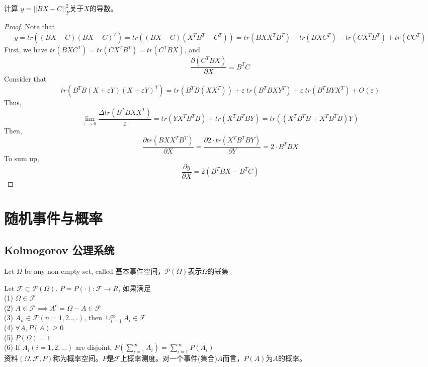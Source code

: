 \documentclass[11pt,fleqn]{book} %
\begin{document}
\begin{CJK}{UTF8}{gkai}
\begin{example}
    计算 $y = ||BX - C||_F^2$关于$X$的导数。
\end{example}
\begin{proof}
    Note that 
    \[
        y = tr\left((BX - C)(BX-C)^T\right) = tr\left((BX-C)(X^TB^T-C^T)\right) = tr\left(BXX^TB^T\right) - tr\left(BXC^T\right) - tr\left(CX^TB^T\right) + tr\left(CC^T\right)\]   
    First, we have $tr\left(BXC^T\right) = tr\left(CX^TB^T\right) = tr\left(C^TBX\right)$, and 
    \[
        \frac{\partial (C^TBX)}{\partial X} = B^TC\]
    Consider that 
    \[
        tr\left(B^TB(X + \varepsilon Y)(X + \varepsilon Y)^T\right) = tr\left(B^TB(XX^T)\right) + \varepsilon \ tr\left(B^TBXY^T\right) + \varepsilon \ tr\left(B^TBYX^T\right) + O(\varepsilon)
        \]
    Thus, 
    \[
        \lim_{\varepsilon \to 0} \frac {\Delta tr(B^TBXX^T)}{\varepsilon} = tr(YX^TB^TB) + tr(X^TB^TBY) = tr\left((X^TB^TB+X^TB^TB)Y\right)\]
    Then,
    \[
        \frac{\partial tr\left(BXX^TB^T\right)}{\partial X} = \frac{\partial 2\cdot tr\left(X^TB^TBY\right)}{\partial Y} = 2 \cdot B^TBX \]
    To sum up, 
    \[
        \frac{\partial y}{\partial X} = 2(B^TBX - B^TC)\]
\end{proof}

\chapter{随机事件与概率}
\section{Kolmogorov 公理系统}

\def\F{\mathcal{F}}
Let $\Omega$ be any non-empty set, called 基本事件空间，$\mathcal{P}(\Omega)$表示$\Omega$的幂集
\begin{definition}
    Let $\mathcal{F} \subset \mathcal{P}(\Omega)$. $P = P(\cdot) :\mathcal{F} \to R$, 如果满足 \\
    (1) $\Omega \in \mathcal{F}$ \\
    (2) $A \in \mathcal{F} \implies A^c = \Omega - A \in \mathcal{F}$ \\
    (3) $A_n \in \mathcal{F}(n = 1, 2..,.)$, then $\cup_{i = 1}^{\infty} A_i \in \mathcal{F} $ \\
    (4) $\forall A, P(A) \geq 0$ \\
    (5) $P(\Omega) = 1$ \\
    (6) If $A_i (i = 1, 2, ...)$ are disjoint, $P(\sum_{i = 1}^{\infty}A_i) = \sum_{i = 1}^{\infty}P(A_i)$ \\
    资料$(\Omega, \F, P)$称为概率空间。$P$是$\F$上概率测度。对一个事件(集合)$A$而言，$P(A)$为$A$的概率。
\end{definition}


\end{CJK}
\end{document}
